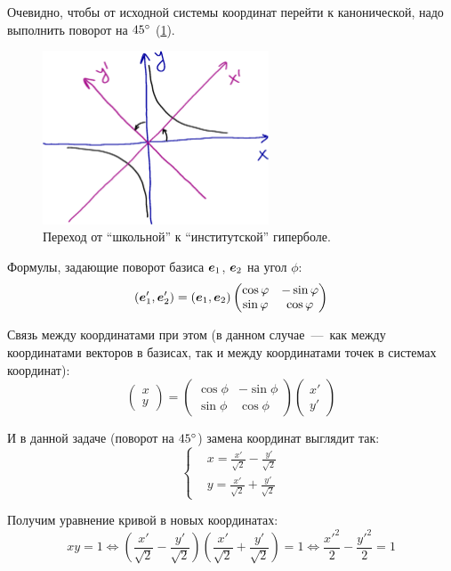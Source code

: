 \documentclass[a4paper,12pt]{article}
\begin{document}
  \begin{solution}
    Очевидно, чтобы от исходной системы координат перейти к канонической, надо выполнить поворот на $45\degree$ (\ref{fig:hyperbola-no-number}).
    
    \begin{figure}[h]
      \centering

      \includegraphics[width=0.6\textwidth]{hyperbola-no-number}
    
      \caption{Переход от ``школьной'' к ``институтской'' гиперболе.}
      \label{fig:hyperbola-no-number}
    \end{figure}
    
    Формулы, задающие поворот базиса $\boldsymbol e_1$, $\boldsymbol e_2$ на угол $\phi$:
    \[
      (\boldsymbol e_1', \boldsymbol e_2') = (\boldsymbol e_1, \boldsymbol e_2) \begin{pmatrix}
        \cos\varphi & -\sin\varphi\\
        \sin\varphi & \cos\varphi
      \end{pmatrix}
    \]
    
    Связь между координатами при этом (в данном случае~---~как между координатами векторов в базисах, так и между координатами точек в системах координат):
    \[
      \begin{pmatrix}
        x\\ y
      \end{pmatrix} = \begin{pmatrix}
        \cos\phi & -\sin\phi\\
        \sin\phi & \cos\phi
      \end{pmatrix} \begin{pmatrix}
        x'\\y'
      \end{pmatrix}
    \]
    
    И в данной задаче (поворот на $45\degree$) замена координат выглядит так:
    \[
      \left\{
        \begin{aligned}
          &x = \frac{x'}{\sqrt{2}} - \frac{y'}{\sqrt{2}}\\
          &y = \frac{x'}{\sqrt{2}} + \frac{y'}{\sqrt{2}}
        \end{aligned}
      \right.
    \]
    
    Получим уравнение кривой в новых координатах:
    \[
      xy = 1
      \Leftrightarrow \left(\frac{x'}{\sqrt{2}} - \frac{y'}{\sqrt{2}}\right) \left(\frac{x'}{\sqrt{2}} + \frac{y'}{\sqrt{2}}\right) = 1
      \Leftrightarrow \boxed{\frac{x'^2}{2} - \frac{y'^2}{2} = 1}
    \]
  \end{solution}
  
\end{document}
